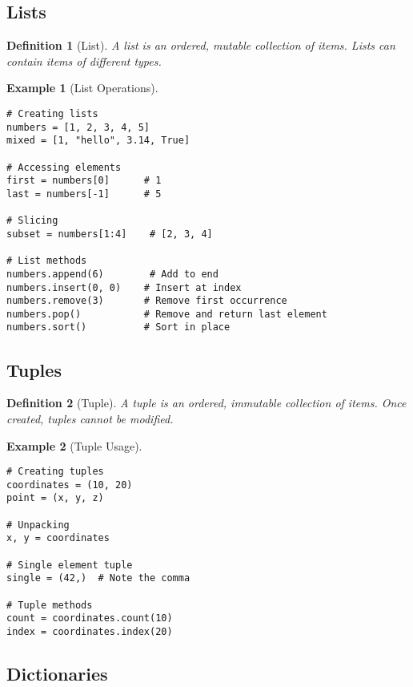 \documentclass[11pt]{article}
\newtheorem{definition}{Definition}[section]
\newtheorem{example}{Example}[section]
\begin{document}
\subsection{Lists}

\begin{definition}[List]
A list is an ordered, mutable collection of items. Lists can contain items of different types.
\end{definition}

\begin{example}[List Operations]
\begin{lstlisting}
# Creating lists
numbers = [1, 2, 3, 4, 5]
mixed = [1, "hello", 3.14, True]

# Accessing elements
first = numbers[0]      # 1
last = numbers[-1]      # 5

# Slicing
subset = numbers[1:4]    # [2, 3, 4]

# List methods
numbers.append(6)        # Add to end
numbers.insert(0, 0)    # Insert at index
numbers.remove(3)       # Remove first occurrence
numbers.pop()           # Remove and return last element
numbers.sort()          # Sort in place
\end{lstlisting}
\end{example}

\subsection{Tuples}

\begin{definition}[Tuple]
A tuple is an ordered, immutable collection of items. Once created, tuples cannot be modified.
\end{definition}

\begin{example}[Tuple Usage]
\begin{lstlisting}
# Creating tuples
coordinates = (10, 20)
point = (x, y, z)

# Unpacking
x, y = coordinates

# Single element tuple
single = (42,)  # Note the comma

# Tuple methods
count = coordinates.count(10)
index = coordinates.index(20)
\end{lstlisting}
\end{example}

\subsection{Dictionaries}
\end{document}
